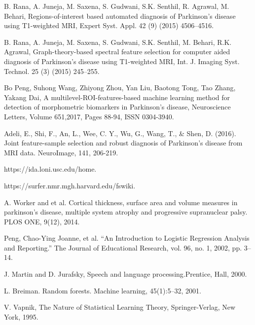 \documentclass[runningheads,a4paper]{llncs}
\begin{document}
\begin{thebibliography}{4}
 B. Rana, A. Juneja, M. Saxena, S. Gudwani, S.K. Senthil, R. Agrawal, M. Behari, Regions-of-interest based automated diagnosis of Parkinson’s disease using T1-weighted MRI, Expert Syst. Appl. 42 (9) (2015) 4506–4516.

 B. Rana, A. Juneja, M. Saxena, S. Gudwani, S.K. Senthil, M. Behari, R.K. Agrawal, Graph-theory-based spectral feature selection for computer aided diagnosis of Parkinson’s disease using T1-weighted MRI, Int. J. Imaging Syst. Technol. 25 (3) (2015) 245–255.

 Bo Peng, Suhong Wang, Zhiyong Zhou, Yan Liu, Baotong Tong, Tao Zhang, Yakang Dai, A multilevel-ROI-features-based machine learning method for detection of morphometric  biomarkers in Parkinson’s disease, Neuroscience Letters, Volume 651,2017, Pages 88-94, ISSN 0304-3940.

 Adeli, E., Shi, F., An, L., Wee, C. Y., Wu, G., Wang, T., \& Shen, D. (2016). Joint feature-sample selection and robust diagnosis of Parkinson's disease from MRI data. NeuroImage, 141, 206-219.

 https://ida.loni.usc.edu/home.

 https://surfer.nmr.mgh.harvard.edu/fswiki.

  A.  Worker  and et al. Cortical  thickness,  surface  area  and  volume  measures  in  parkinson’s  disease, multiple system atrophy and progressive supranuclear palsy. PLOS ONE, 9(12), 2014.

 Peng, Chao-Ying Joanne, et al. “An Introduction to Logistic Regression Analysis and Reporting.” The Journal of Educational Research, vol. 96, no. 1, 2002, pp. 3–14.

 J. Martin and D. Jurafsky, Speech and language processing.Prentice, Hall, 2000.



 L. Breiman. Random forests. Machine learning, 45(1):5–32, 2001.

 V. Vapnik, The Nature of Statistical Learning Theory, Springer-Verlag, New York, 1995.

\end{thebibliography}



\end{document}

